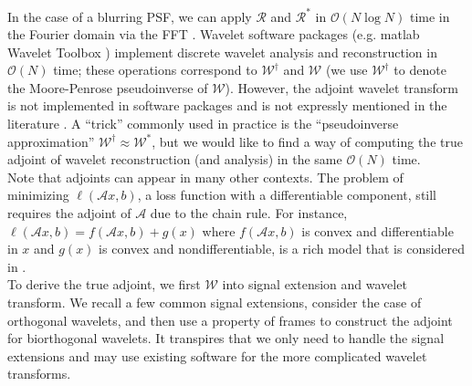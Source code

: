 \documentclass[journal]{IEEEtran}
\begin{document}
\noindent In the case of a blurring PSF, we can apply $\mathcal{R}$ and $\mathcal{R}^\ast$ in $\mathcal{O}(N\log N)$ time in the Fourier domain via the FFT \cite{beck_2009, hansen_2006}.  Wavelet software packages (e.g. {\sc matlab} Wavelet Toolbox \cite{matlab_wt_2015}) implement discrete wavelet analysis and reconstruction in $\mathcal{O}(N)$ time; these operations correspond to $\mathcal{W}^\dagger$ and $\mathcal{W}$ (we use $\mathcal{W}^\dagger$ to denote the Moore-Penrose pseudoinverse of $\mathcal{W}$).  However, the adjoint wavelet transform is not implemented in software packages and is not expressly mentioned in the literature \cite{mallat_2009, daubechies_1992, strang_1996}.  A ``trick'' commonly used in practice is the ``pseudoinverse approximation'' $\mathcal{W}^\dagger\approx\mathcal{W}^\ast$, but we would like to find a way of computing the true adjoint of wavelet reconstruction (and analysis) in the same $\mathcal{O}(N)$ time. \\


Note that adjoints can appear in many other contexts.  The problem of minimizing $\ell(\mathcal{A}x,b)$, a loss function with a differentiable component, still requires the adjoint of $\mathcal{A}$ due to the chain rule.  For instance, $\ell(\mathcal{A}x,b) = f(\mathcal{A}x,b)+g(x)$ where $f(\mathcal{A}x,b)$ is convex and differentiable in $x$ and $g(x)$ is convex and nondifferentiable, is a rich model that is considered in \cite{beck_2009b}.\\

To derive the true adjoint, we first $\mathcal{W}$ into signal extension and wavelet transform.  We recall a few common signal extensions, consider the case of orthogonal wavelets, and then use a property of frames to construct the adjoint for biorthogonal wavelets.  It transpires that we only need to handle the signal extensions and may use existing software for the more complicated wavelet transforms.\\
\end{document}
